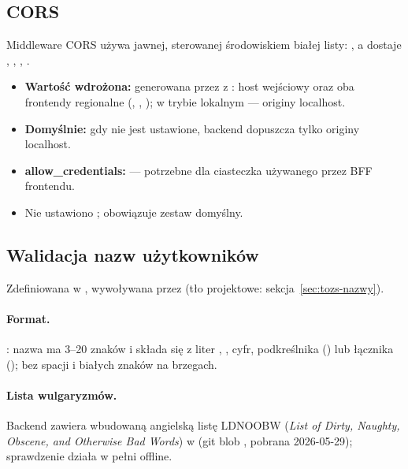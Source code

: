 \subsection{CORS}
\label{sec:konf-cors}

Middleware CORS używa jawnej, sterowanej środowiskiem białej listy:
, a
 dostaje ,
, , .

\begin{itemize}
  \item \textbf{Wartość wdrożona:} generowana przez  z
        : host wejściowy oraz oba frontendy regionalne
        (, ,
        ); w trybie lokalnym --- originy localhost.
  \item \textbf{Domyślnie:} gdy  nie jest ustawione, backend dopuszcza
        tylko originy localhost.
  \item \textbf{allow\_credentials:}  --- potrzebne dla ciasteczka 
        używanego przez BFF frontendu.
  \item Nie ustawiono ; obowiązuje zestaw domyślny.
\end{itemize}

\subsection{Walidacja nazw użytkowników}
\label{sec:konf-nazwy}

Zdefiniowana w , wywoływana przez 
(tło projektowe: sekcja~\ref{sec:tozs-nazwy}).

\paragraph{Format.} : nazwa ma
3--20 znaków i składa się z liter , , cyfr, podkreślnika (\code{_}) lub
łącznika (\code{-}); bez spacji i białych znaków na brzegach.

\paragraph{Lista wulgaryzmów.} Backend zawiera wbudowaną angielską listę LDNOOBW
(\emph{List of Dirty, Naughty, Obscene, and Otherwise Bad Words}) w
 (git blob
, pobrana 2026-05-29); sprawdzenie
działa w pełni offline.

